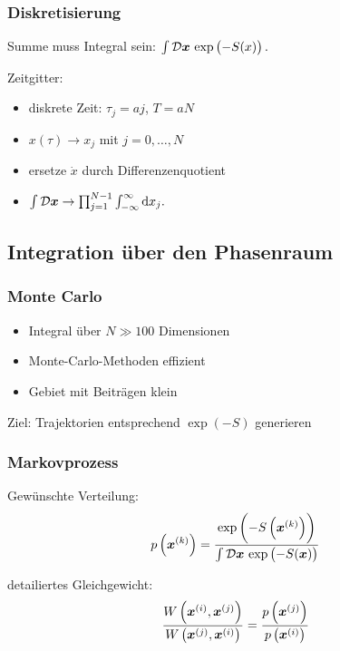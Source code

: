 \documentclass[ngerman, fleqn]{beamer}
\newcommand\timesites{N}
\newcommand\funcmeasure{\mathcal D \vec x}
\begin{document}
\begin{frame}
    \frametitle{Diskretisierung}

    Summe muss Integral sein:
    \(
        \int \funcmeasure \, \exp\del{-S(x)}.
    \)

    Zeitgitter:
    \begin{itemize}
        \item
            diskrete Zeit: $\tau_j = a j$, $T = aN$
        \item
            $x(\tau) \to x_j$ mit $j = 0, \ldots, N$
        \item
            ersetze $\dot x$ durch Differenzenquotient
        \item
            \(
            \int \funcmeasure
            \to
            \prod_{j = 1}^{\timesites-1} \int_{-\infty}^\infty \dif x_j.
            \)
    \end{itemize}

\end{frame}

\subsection{Integration über den Phasenraum}

\frame\subsectionpage

\begin{frame}
    \frametitle{Monte Carlo}

    \begin{itemize}
        \item 
            Integral über $N \gg 100$ Dimensionen
        \item
            Monte-Carlo-Methoden effizient
        \item
            Gebiet mit Beiträgen klein
    \end{itemize}

    Ziel: Trajektorien entsprechend $\exp(-S)$ generieren
\end{frame}

\begin{frame}
    \frametitle{Markovprozess}

    Gewünschte Verteilung:
    \[
        p\del{\vec x^{(k)}} = \frac{\exp\del{-S\del{\vec x^{(k)}}}}{\int
            \funcmeasure
        \, \exp\del{-S(\vec x)}}
    \]

    detailiertes Gleichgewicht:
    \[
        \frac{W\del{\vec x^{(i)}, \vec x^{(j)}}}{W\del{\vec x^{(j)}, \vec x^{(i)}}}
        = \frac{p\del{\vec x^{(j)}}}{p\del{\vec x^{(i)}}}
    \]
\end{frame}
\end{document}
